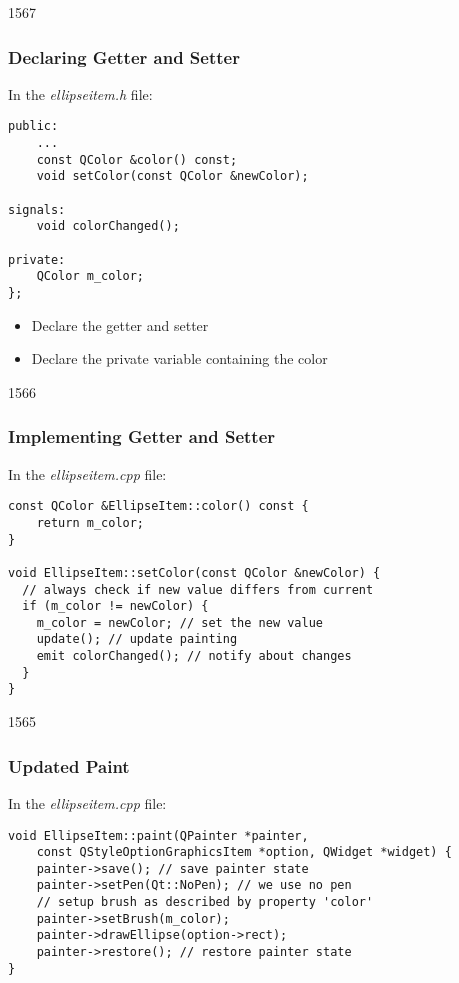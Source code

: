 \begin{slide}[fragile]{1567}\frametitle{Declaring Getter and Setter}

In the \textit{ellipseitem.h} file:

\vspace*{0.5em}
\begin{lstlisting}
public:
    ...
    const QColor &color() const;
    void setColor(const QColor &newColor);

signals:
    void colorChanged();

private:
    QColor m_color;
};
\end{lstlisting}

\begin{itemize}
\item Declare the getter and setter
\item Declare the private variable containing the color
\end{itemize}

\end{slide}

\begin{slide}[fragile]{1566}\frametitle{Implementing Getter and Setter}

In the \textit{ellipseitem.cpp} file:

\vspace*{0.25em}
\begin{lstlisting}
const QColor &EllipseItem::color() const {
    return m_color;
}

void EllipseItem::setColor(const QColor &newColor) {
  // always check if new value differs from current
  if (m_color != newColor) {
    m_color = newColor; // set the new value
    update(); // update painting
    emit colorChanged(); // notify about changes
  }
}
\end{lstlisting}

\end{slide}

\begin{slide}[fragile]{1565}\frametitle{Updated Paint}

In the \textit{ellipseitem.cpp} file:

\vspace*{0.5em}
\begin{lstlisting}
void EllipseItem::paint(QPainter *painter,
    const QStyleOptionGraphicsItem *option, QWidget *widget) {
    painter->save(); // save painter state
    painter->setPen(Qt::NoPen); // we use no pen
    // setup brush as described by property 'color'
    painter->setBrush(m_color); 
    painter->drawEllipse(option->rect);
    painter->restore(); // restore painter state
}
\end{lstlisting}

\end{slide}

